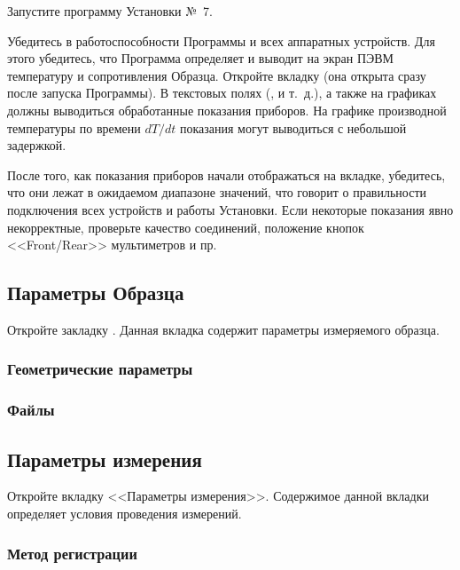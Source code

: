 \documentclass[12pt, a4paper, twocolumn]{report}
\begin{document}
Запустите программу Установки №~7.

Убедитесь в работоспособности Программы и всех аппаратных устройств. Для этого убедитесь, что Программа определяет и выводит на экран ПЭВМ температуру и сопротивления Образца. Откройте вкладку  (она открыта сразу после запуска Программы). В текстовых полях (,  и т.~д.), а также на графиках должны выводиться обработанные показания приборов. На графике производной температуры по времени $dT/dt$ показания могут выводиться с небольшой задержкой.

После того, как показания приборов начали отображаться на вкладке, убедитесь, что они лежат в ожидаемом диапазоне значений, что говорит о правильности подключения всех устройств и работы Установки. Если некоторые показания явно некорректные, проверьте качество соединений, положение кнопок <<Front/Rear>> мультиметров и пр.

\subsection{Параметры Образца}

Откройте закладку . Данная вкладка содержит параметры измеряемого образца.

\subsubsection{Геометрические параметры}
\label{sec_geom_params}



\subsubsection{Файлы}



\subsection{Параметры измерения}

Откройте вкладку <<Параметры измерения>>. Содержимое данной вкладки определяет условия проведения измерений.

\subsubsection{Метод регистрации}
\label{sec_reg_method}
\end{document}
